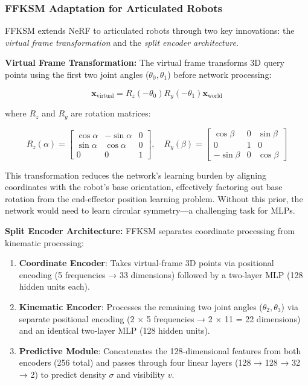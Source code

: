 \documentclass[12pt,a4paper,oneside]{report}
\begin{document}
\subsubsection{FFKSM Adaptation for Articulated Robots}

FFKSM extends NeRF to articulated robots through two key innovations: the \textit{virtual frame transformation} and the \textit{split encoder architecture}.

\textbf{Virtual Frame Transformation:} The virtual frame transforms 3D query points using the first two joint angles ($\theta_0, \theta_1$) before network processing:

\begin{equation}
\mathbf{x}_{\text{virtual}} = R_z(-\theta_0) R_y(-\theta_1) \mathbf{x}_{\text{world}}
\end{equation}

where $R_z$ and $R_y$ are rotation matrices:

\begin{equation}
R_z(\alpha) = \begin{bmatrix}
\cos\alpha & -\sin\alpha & 0 \\
\sin\alpha & \cos\alpha & 0 \\
0 & 0 & 1
\end{bmatrix}, \quad
R_y(\beta) = \begin{bmatrix}
\cos\beta & 0 & \sin\beta \\
0 & 1 & 0 \\
-\sin\beta & 0 & \cos\beta
\end{bmatrix}
\end{equation}

This transformation reduces the network's learning burden by aligning coordinates with the robot's base orientation, effectively factoring out base rotation from the end-effector position learning problem. Without this prior, the network would need to learn circular symmetry—a challenging task for MLPs.

\textbf{Split Encoder Architecture:} FFKSM separates coordinate processing from kinematic processing:

\begin{enumerate}
    \item \textbf{Coordinate Encoder}: Takes virtual-frame 3D points via positional encoding (5 frequencies → 33 dimensions) followed by a two-layer MLP (128 hidden units each).
    \item \textbf{Kinematic Encoder}: Processes the remaining two joint angles ($\theta_2, \theta_3$) via separate positional encoding (2 × 5 frequencies → 2 × 11 = 22 dimensions) and an identical two-layer MLP (128 hidden units).
    \item \textbf{Predictive Module}: Concatenates the 128-dimensional features from both encoders (256 total) and passes through four linear layers (128 → 128 → 32 → 2) to predict density $\sigma$ and visibility $v$.
\end{enumerate}
\end{document}

